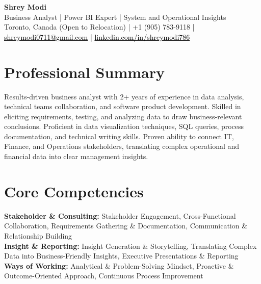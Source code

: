 \documentclass[10.5pt,letterpaper]{article}
\begin{document}
\begin{center}
  {\Huge \bfseries \color{accent} Shrey Modi}\\[0.3em]
  {\normalsize Business Analyst | Power BI Expert | System and Operational Insights}\\[0.1em]
  {\small
    Toronto, Canada (Open to Relocation)
 | +1 (905) 783-9118 | \href{mailto:shreymodi0711@gmail.com}{\textcolor{black}{shreymodi0711@gmail.com}} | \href{https://linkedin.com/in/shreymodi786}{\textcolor{black}{linkedin.com/in/shreymodi786}}  }
\end{center}
\vspace{-12pt}

\section{Professional Summary}
\noindent Results-driven business analyst with 2+ years of experience in data analysis, technical teams collaboration, and software product development. Skilled in eliciting requirements, testing, and analyzing data to draw business-relevant conclusions. Proficient in data visualization techniques, SQL queries, process documentation, and technical writing skills. Proven ability to connect IT, Finance, and Operations stakeholders, translating complex operational and financial data into clear management insights.

\section{Core Competencies}
\noindent
\textbf{Stakeholder \& Consulting:} Stakeholder Engagement, Cross-Functional Collaboration, Requirements Gathering \& Documentation, Communication \& Relationship Building\\\textbf{Insight \& Reporting:} Insight Generation \& Storytelling, Translating Complex Data into Business-Friendly Insights, Executive Presentations \& Reporting\\\textbf{Ways of Working:} Analytical \& Problem-Solving Mindset, Proactive \& Outcome-Oriented Approach, Continuous Process Improvement
\end{document}
